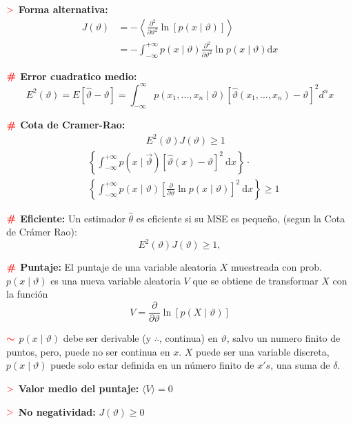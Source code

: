 \documentclass[%
 reprint,
 amsmath,amssymb,
 aps,
]{revtex4-1}
\begin{document}
\textbf{$\textcolor{red}{\mathbf{>}}$ Forma alternativa:} 
$$
\begin{aligned}
J(\vartheta) &=-\left\langle\frac{\partial^{2}}{\partial \vartheta^{2}} \ln [p(x \mid \vartheta)]\right\rangle \\
&=-\int_{-\infty}^{+\infty} p(x \mid \vartheta) \frac{\partial^{2}}{\partial \vartheta^{2}} \ln p(x \mid \vartheta) \mathrm{d} x
\end{aligned}
$$

\textbf{$\color{red}{\textbf{\#}}$ Error cuadratico medio:}
$$
E^{2}(\vartheta) = E[ \hat{\vartheta} - \vartheta ] = \int_{-\infty}^\infty p\left(x_{1}, \ldots, x_{n} \mid \vartheta\right)\left[\hat{\vartheta}\left(x_{1}, \ldots, x_{n}\right)-\vartheta\right]^{2} {d}^{n} x 
$$

\textbf{$\color{red}{\textbf{\#}}$ Cota de Cramer-Rao:}
$$
\begin{aligned}
  &\qquad \qquad \qquad E^{2}(\vartheta) J(\vartheta) \geq 1 \\
  &\left\{\int_{-\infty}^{+\infty} p(x \mid \vec{\vartheta})[\hat{\vartheta}(x)-\vartheta]^{2} \mathrm{~d} x\right\}
  \cdot \\
  &\left\{\int_{-\infty}^{+\infty} p(x \mid \vartheta)\left[\frac{\partial}{\partial \vartheta} \ln p(x \mid \vartheta)\right]^{2} \mathrm{~d} x\right\} \geq 1  
\end{aligned}
$$

\textbf{$\color{red}{\textbf{\#}}$ Eficiente:} 
Un estimador $\hat{\theta}$ es eficiente si su MSE es pequeño, (segun la Cota de Crámer Rao):
$$
E^{2}(\vartheta) J(\vartheta) \geq 1,
$$

\textbf{$\color{red}{\textbf{\#}}$ Puntaje:} 
El puntaje de una variable aleatoria $X$ muestreada con prob. $p(x \mid \vartheta)$ es una nueva variable
aleatoria $V$ que se obtiene de transformar $X$ con la función
$$
V=\frac{\partial}{\partial \vartheta} \ln [p(X \mid \vartheta)]
$$

\textbf{$\textcolor{red}{\color{red}{\boldsymbol{\sim}}}$}
$p(x \mid \vartheta)$ debe ser derivable (y $\boldsymbol{\therefore}$, continua) en $\vartheta$, salvo un numero finito de puntos, pero, puede no ser continua en $x$. $X$ puede ser una variable discreta, $p(x \mid \vartheta)$ puede solo estar definida en un número finito de $x's$, una suma de $\delta$.

\textbf{$\textcolor{red}{\mathbf{>}}$ Valor medio del puntaje:} 
$\langle V \rangle = 0$

\textbf{$\textcolor{red}{\mathbf{>}}$ No negatividad:} 
$J(\vartheta) \geq 0$ 
\end{document}
